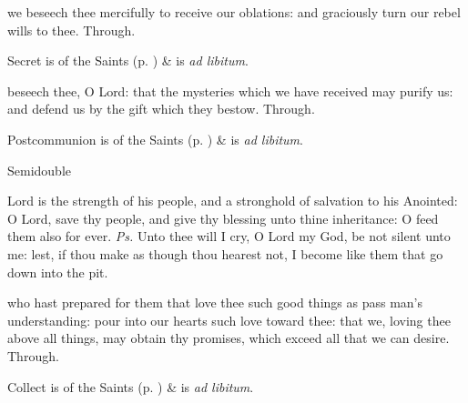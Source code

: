 
\secret
{} we beseech thee mercifully to receive our oblations: and graciously turn our rebel wills to thee. Through.

\begin{rubric}
     Secret is of the Saints (p. \pageref{SPSaints}) \&  is \emph{ad libitum}.
\end{rubric}


\postcommunion
{} beseech thee, O Lord: that the mysteries which we have received may purify us: and defend us by the gift which they bestow. Through.
\begin{rubric}
     Postcommunion is of the Saints (p. \pageref{SPSaints}) \&  is \emph{ad libitum}.
\end{rubric}

\begin{inhead}
    {Semidouble}
\end{inhead}

\properantiphonfix

\introit
{} Lord is the strength of his people, and a stronghold of salvation to his Anointed: O Lord, save thy people, and give thy blessing unto thine inheritance: O feed them also for ever. \textit{Ps.} Unto thee will I cry, O Lord my God, be not silent unto me: lest, if thou make as though thou hearest not, I become like them that go down into the pit.

\collect
{} who hast prepared for them that love thee such good things as pass man's understanding: pour into our hearts such love toward thee: that we, loving thee above all things, may obtain thy promises, which exceed all that we can desire. Through.
\begin{rubric}
     Collect is of the Saints (p. \pageref{SPSaints}) \&  is \emph{ad libitum}.
\end{rubric}

